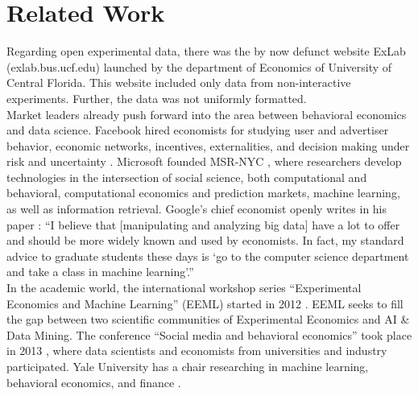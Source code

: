 \documentclass[conference]{IEEEtran}
\begin{document}
\section{Related Work}
\indent Regarding open experimental data, there was the by now defunct website ExLab (exlab.bus.ucf.edu) launched by the department of Economics of University of Central Florida. This website included only data from non-interactive experiments. Further, the data was not uniformly formatted.\\
\indent Market leaders already push forward into the area between behavioral economics and data science. Facebook hired economists for studying user and advertiser behavior, economic networks, incentives, externalities, and decision making under risk and uncertainty \cite{facebookbe}. Microsoft founded MSR-NYC \cite{microsoftbe}, where researchers develop technologies in the intersection of social science, both computational and behavioral, computational economics and prediction markets, machine learning, as well as information retrieval. Google's chief economist openly writes in his paper \cite{varian}: ``I believe that [manipulating and analyzing big data] have a lot to offer and should be more widely known and used by economists. In fact, my standard advice to graduate students these days is `go to the computer science department and take a class in machine learning'.''\\ 
\indent In the academic world, the international workshop series ``Experimental Economics and Machine Learning'' (EEML) started in 2012 \cite{eeml1be,eeml2be,eeml3be}. EEML seeks to fill the gap between two scientific communities of Experimental Economics and AI \& Data Mining. The conference ``Social media and behavioral economics'' took place in 2013 \cite{harvardbe}, where data scientists and economists from universities and industry participated. Yale University has a chair researching in machine learning, behavioral economics, and finance \cite{brown}.\\
\end{document}
